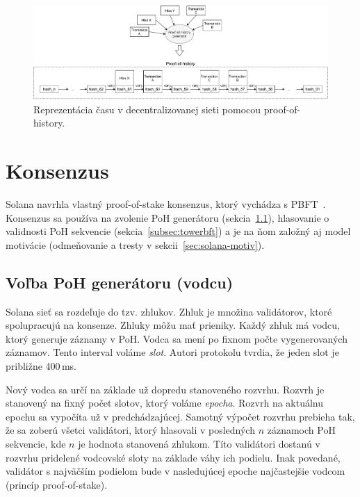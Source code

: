 \begin{figure}[bt]
	\centering
	\includegraphics[width=\textwidth]{obrazky-figures/solana-poh-time}
	\caption{Reprezentácia času v decentralizovanej sieti pomocou proof-of-history.}
	\label{img:solana-poh}
\end{figure}

\section{Konsenzus}\label{sec:solana-consens}

Solana navrhla vlastný proof-of-stake konsenzus, ktorý vychádza s PBFT~\cite{pbftCastro}. Konsenzus sa používa na zvolenie PoH generátoru (sekcia~\ref{subsec:pos-generator}), hlasovanie o validnosti PoH sekvencie (sekcia~\ref{subsec:towerbft}) a je na ňom založný aj model motivácie (odmeňovanie a tresty v sekcii~\ref{sec:solana-motiv}).

\subsection{Voľba PoH generátoru (vodcu)}\label{subsec:pos-generator}

Solana sieť sa rozdeľuje do tzv. zhlukov. Zhluk je množina validátorov, ktoré spolupracujú na konsenze. Zhluky môžu mať prieniky. Každý zhluk má vodcu, ktorý generuje záznamy v PoH. Vodca sa mení po fixnom počte vygenerovaných záznamov. Tento interval voláme \textit{slot}. Autori protokolu tvrdia, že jeden slot je približne 400\,ms. 

Nový vodca sa určí na základe už dopredu stanoveného rozvrhu. Rozvrh je stanovený na fixný počet slotov, ktorý voláme \textit{epocha}. Rozvrh na aktuálnu epochu sa vypočíta už v predchádzajúcej. Samotný výpočet rozvrhu prebieha tak, že sa zoberú všetci validátori, ktorý hlasovali v posledných $n$ záznamoch PoH sekvencie, kde $n$ je hodnota stanovená zhlukom. Títo validátori dostanú v rozvrhu pridelené vodcovské sloty na základe váhy ich podielu. Inak povedané, validátor s najväčším podielom bude v nasledujúcej epoche najčastejšie vodcom (princíp proof-of-stake).

